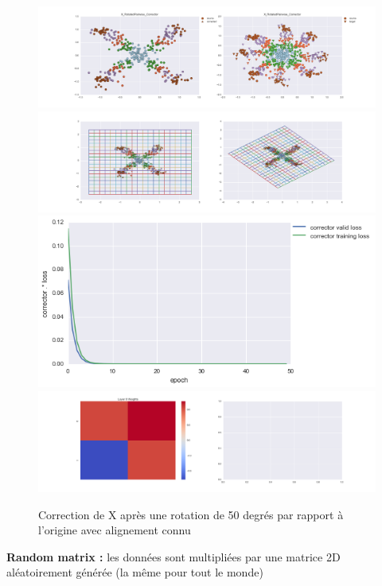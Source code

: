 \begin{figure}[H] %
\centering
\includegraphics[width=\linewidth]{fig/24-05-2016/X/X_RotatedPairwise_Corrector-DATA.png}
\includegraphics[width=\linewidth]{fig/24-05-2016/X/X_RotatedPairwise_Corrector-GridCheck.png}
\includegraphics[width=0.45\linewidth]{fig/24-05-2016/X/X_RotatedPairwise_Corrector-Learning_curve.png}
\includegraphics[width=\linewidth]{fig/24-05-2016/X/X_RotatedPairwise_Corrector-W.png}
\caption{Correction de X après une rotation de 50 degrés par rapport à l'origine avec alignement connu}
\label{fig:recap-X-rot-pairwise}
\end{figure}


{\Large \textbf{Random matrix :}} les données sont multipliées par une matrice 2D aléatoirement générée
 (la même pour tout le monde)

